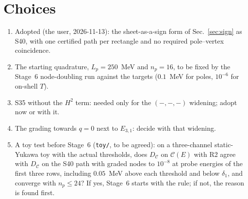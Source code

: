 \documentclass[11pt]{article}
\newcommand{\file}[1]{\nolinkurl{#1}}
\begin{document}
\section{Choices}
\begin{enumerate}
\item Adopted (the user, 2026-11-13): the sheet-as-a-sign form of Sec.~\ref{sec:sign} as S40, with one certified path per rectangle and no required pole--vertex coincidence.
\item The starting quadrature, $L_p=250$~MeV and $n_p=16$, to be fixed by the Stage~6 node-doubling run against the targets ($0.1$~MeV for poles, $10^{-6}$ for on-shell $T$).
\item S35 without the $H^2$ term: needed only for the $(-,-,-)$ widening; adopt now or with it.
\item The grading towards $q=0$ next to $E_{3,1}$: decide with that widening.
\item A toy test before Stage~6 (\file{toy/}, to be agreed): on a three-channel static-Yukawa toy with the actual thresholds, does $D_{\mathcal C}$ on $\mathcal C(E)$ with R2 agree with $D_{\mathcal C}$ on the S40 path with graded nodes to $10^{-8}$ at probe energies of the first three rows, including $0.05$~MeV above each threshold and below $\delta_1$, and converge with $n_p\le24$? If yes, Stage~6 starts with the rule; if not, the reason is found first.
\end{enumerate}


\end{document}
